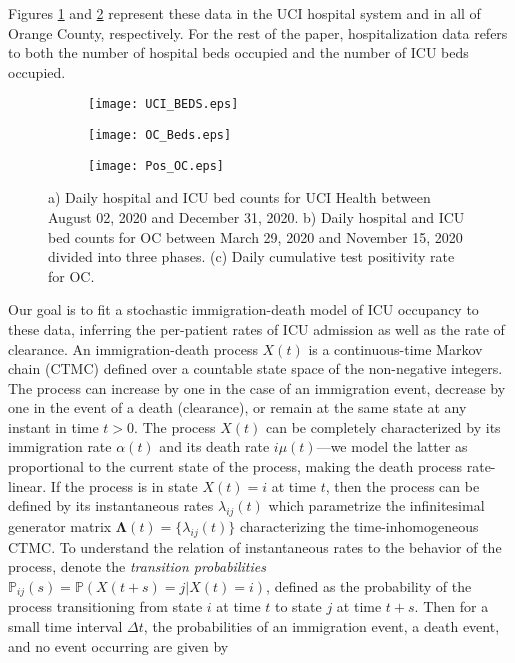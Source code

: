 \documentclass{article}
\begin{document}
Figures \ref{fig4:sub1} and \ref{fig4:sub2} represent these data in the UCI hospital system and in all of Orange County, respectively. For the rest of the paper, hospitalization data refers to both the number of hospital beds occupied and the number of ICU beds occupied.

\begin{figure}[h]
\centering
{}
\begin{subfigure}{0.50\textwidth}
   \texttt{[image: UCI\_BEDS.eps]}
   \vspace{-0.75cm}
   \caption{}
   \label{fig4:sub1}
\end{subfigure}
\begin{subfigure}{0.50\textwidth}
   \texttt{[image: OC\_Beds.eps]}
   \vspace{-0.75cm}
   \caption{}
   \label{fig4:sub2}
\end{subfigure}
\begin{subfigure}{0.50\textwidth}
   \texttt{[image: Pos\_OC.eps]}
   \vspace{-0.25cm}
   \caption{}
   \label{fig4:sub3}
\end{subfigure}
\caption{a) Daily hospital and ICU bed counts for UCI Health between August 02, 2020 and December 31, 2020. b) Daily hospital and ICU bed counts for OC between March 29, 2020 and November 15, 2020 divided into three phases. (c) Daily cumulative test positivity rate for OC.}
\label{fig:4}
\end{figure}
Our goal is to fit a stochastic immigration-death model of ICU occupancy to these data, inferring the per-patient rates of ICU admission as well as the rate of clearance. An immigration-death process $X(t)$ is a continuous-time Markov chain (CTMC) defined over a countable state space of the non-negative integers. The process can increase by one in the case of an immigration event, decrease by one in the event of a death (clearance), or remain at the same state at any instant in time $t>0$. The process $X(t)$ can be completely characterized by its immigration rate $\alpha(t)$ and its death rate $i \mu(t)$---we model the latter as proportional to the current state of the process, making the death process rate-linear. If the process is in state $X(t)=i$ at time $t$,     
then the process can be defined by its instantaneous rates $\lambda_{ij}(t)$ which parametrize the infinitesimal generator matrix  $\pmb{\Lambda} (t) = \{\lambda_{ij}(t) \}$ characterizing the time-inhomogeneous CTMC. To understand the relation of instantaneous rates to the behavior of the process, denote the \textit{transition probabilities}  $\mathbb{P}_{ij}(s) = \mathbb{P}(X(t+s)=j|X(t)=i)$, defined as the probability of the process transitioning from state $i$ at time $t$ to state $j$ at time $t+s$.  Then for a small time interval $\Delta t$, the probabilities of an immigration event, a death event, and no event occurring are given by
\end{document}

